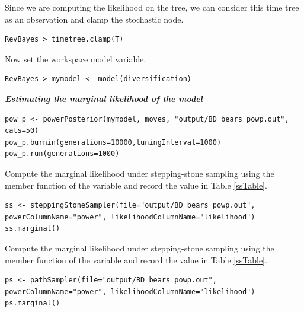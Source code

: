 Since we are computing the likelihood on the \citet{dosReis2012} tree, we can consider this time tree as an observation and clamp the stochastic node.
{\tt \begin{snugshade*}
\begin{lstlisting}
RevBayes > timetree.clamp(T)
\end{lstlisting}
\end{snugshade*}}

Now set the workspace model variable.
{\tt \begin{snugshade*}
\begin{lstlisting}
RevBayes > mymodel <- model(diversification)
\end{lstlisting}
\end{snugshade*}}

\textbf{\textit{Estimating the marginal likelihood of the model}}


{\tt \begin{snugshade*}
\begin{lstlisting}
pow_p <- powerPosterior(mymodel, moves, "output/BD_bears_powp.out", cats=50) 
pow_p.burnin(generations=10000,tuningInterval=1000)
pow_p.run(generations=1000)  
\end{lstlisting}
\end{snugshade*}}

Compute the marginal likelihood under stepping-stone sampling using the member function  of the  variable and record the value in Table \ref{ssTable}.
{\tt \small \begin{snugshade*}
\begin{lstlisting}
ss <- steppingStoneSampler(file="output/BD_bears_powp.out", powerColumnName="power", likelihoodColumnName="likelihood")
ss.marginal() 
\end{lstlisting}
\end{snugshade*}}

Compute the marginal likelihood under stepping-stone sampling using the member function  of the  variable and record the value in Table \ref{ssTable}.
{\tt \small \begin{snugshade*}
\begin{lstlisting}
ps <- pathSampler(file="output/BD_bears_powp.out", powerColumnName="power", likelihoodColumnName="likelihood")
ps.marginal() 
\end{lstlisting}
\end{snugshade*}}



